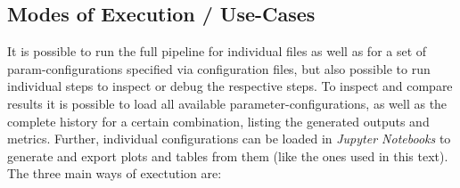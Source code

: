 

\subsection{Modes of Execution / Use-Cases}

It is possible to run the full pipeline for individual files as well as for a set of \gls{param}-configurations specified via configuration files, but also possible to run individual steps to inspect or debug the respective steps. To inspect and compare results it is possible to load all available parameter-configurations, as well as the complete history for a certain combination, listing the generated outputs and metrics. Further, individual configurations can be loaded in \emph{Jupyter Notebooks} to generate and export plots and tables from them (like the ones used in this text). The three main ways of exectution are:

